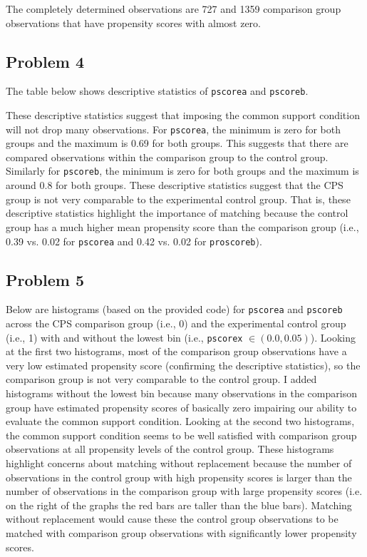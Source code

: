 \documentclass{article}
\begin{document}
The completely determined observations are 727 and 1359 comparison group observations that have propensity scores with almost zero.

\pagebreak

\subsection*{Problem 4}

The table below shows descriptive statistics of \texttt{pscorea} and \texttt{pscoreb}.

\begin{center}

\end{center}

\begin{center}

\end{center}

These descriptive statistics suggest that imposing the common support condition will not drop many observations.  For \texttt{pscorea}, the minimum is zero for both groups and the maximum is 0.69 for both groups.  This suggests that there are compared observations within the comparison group to the control group.  Similarly for \texttt{pscoreb}, the minimum is zero for both groups and the maximum is around 0.8 for both groups. These descriptive statistics suggest that the CPS group is not very comparable to the experimental control group.  That is, these descriptive statistics highlight the importance of matching because the control group has a much higher mean propensity score than the comparison group (i.e., 0.39 vs. 0.02 for \texttt{pscorea} and 0.42 vs. 0.02 for \texttt{proscoreb}).

\subsection*{Problem 5}

Below are histograms (based on the provided code) for \texttt{pscorea} and \texttt{pscoreb} across the CPS comparison group (i.e., 0) and the experimental control group (i.e., 1) with and without the lowest bin (i.e., \texttt{pscorex} $\in (0.0, 0.05)$). Looking at the first two histograms, most of the comparison group observations have a very low estimated propensity score (confirming the descriptive statistics), so the comparison group is not very comparable to the control group. I added histograms without the lowest bin because many observations in the comparison group have estimated propensity scores of basically zero impairing our ability to evaluate the common support condition.  Looking at the second two histograms, the common support condition seems to be well satisfied with comparison group observations at all propensity levels of the control group. These histograms highlight concerns about matching without replacement because the number of observations in the control group with high propensity scores is larger than the number of observations in the comparison group with large propensity scores (i.e. on the right of the graphs the red bars are taller than the blue bars).  Matching without replacement would cause these the control group observations to be matched with comparison group observations with significantly lower propensity scores.
\end{document}
